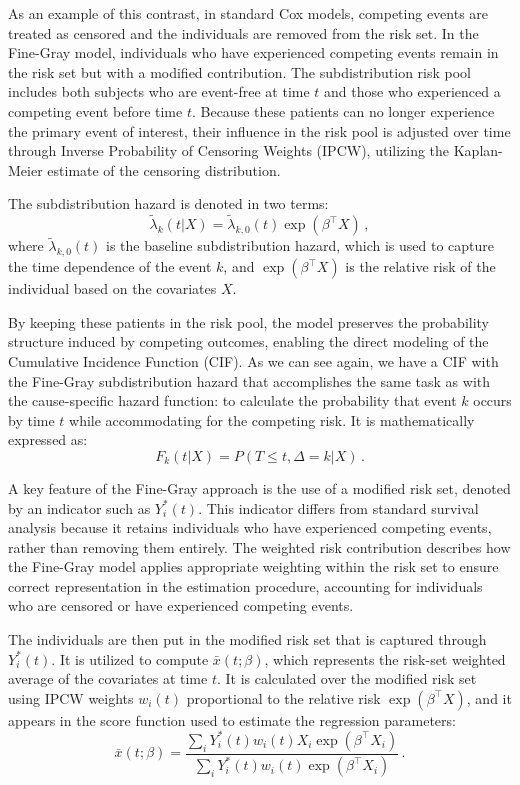\documentclass[a4paper,twoside,12pt]{report}
\begin{document}
As an example of this contrast, in standard Cox models, competing events are treated as censored and the individuals are removed from the risk set. In the Fine-Gray model, individuals who have experienced competing events remain in the risk set but with a modified contribution. The subdistribution risk pool includes both subjects who are event-free at time $t$ and those who experienced a competing event before time $t$. Because these patients can no longer experience the primary event of interest, their influence in the risk pool is adjusted over time through Inverse Probability of Censoring Weights (IPCW), utilizing the Kaplan-Meier estimate of the censoring distribution.

The subdistribution hazard is denoted in two terms:
$$\tilde{\lambda}_k(t|X)=\tilde{\lambda}_{k,0}(t)\exp(\beta^\top X) \,,$$
where $\tilde{\lambda}_{k,0}(t)$ is the baseline subdistribution hazard, which is used to capture the time dependence of the event $k$, and $\exp(\beta^\top X)$ is the relative risk of the individual based on the covariates $X$.

By keeping these patients in the risk pool, the \cite{FineGray1999} model preserves the probability structure induced by competing outcomes, enabling the direct modeling of the Cumulative Incidence Function (CIF). As we can see again, we have a CIF with the Fine-Gray subdistribution hazard that accomplishes the same task as with the cause-specific hazard function: to calculate the probability that event $k$ occurs by time $t$ while accommodating for the competing risk. It is mathematically expressed as:
$$F_k(t|X) = P(T \le t, \Delta=k|X) \,.$$

A key feature of the Fine-Gray approach is the use of a modified risk set, denoted by an indicator such as $Y_i^*(t)$. This indicator differs from standard survival analysis because it retains individuals who have experienced competing events, rather than removing them entirely. The weighted risk contribution describes how the Fine-Gray model applies appropriate weighting within the risk set to ensure correct representation in the estimation procedure, accounting for individuals who are censored or have experienced competing events. 

The individuals are then put in the modified risk set that is captured through $Y_i^*(t)$. It is utilized to compute $\bar{x}(t; \beta)$, which represents the risk-set weighted average of the covariates at time $t$. It is calculated over the modified risk set using IPCW weights $w_i(t)$ proportional to the relative risk $\exp(\beta^\top X)$, and it appears in the score function used to estimate the regression parameters:
$$\bar{x}(t; \beta)=\frac{\sum_i Y_i^*(t) w_i(t) X_i \exp(\beta^\top X_i)}{\sum_i Y_i^*(t) w_i(t) \exp(\beta^\top X_i)} \,.$$
\end{document}

